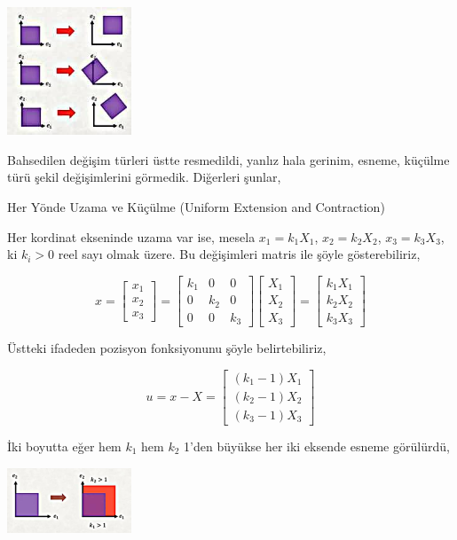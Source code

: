\documentclass[12pt,fleqn]{article}\usepackage{../../common}
\begin{document}
\includegraphics[width=10em]{phy_020_strs_01_04.jpg}

Bahsedilen değişim türleri üstte resmedildi, yanlız hala gerinim, esneme,
küçülme türü şekil değişimlerini görmedik. Diğerleri şunlar,

Her Yönde Uzama ve Küçülme (Uniform Extension and Contraction)

Her kordinat ekseninde uzama var ise, mesela $x_1 = k_1 X_1$, $x_2 = k_2 X_2$,
$x_3 = k_3 X_3$, ki $k_i > 0$ reel sayı olmak üzere. Bu değişimleri matris
ile şöyle gösterebiliriz,

$$
x = \left[\begin{array}{c}
x_1 \\ x_2 \\ x_3
\end{array}\right] =
\left[\begin{array}{ccc}
k_1 & 0   &   0 \\
0   & k_2 & 0 \\
0   & 0   & k_3
\end{array}\right]
\left[\begin{array}{c}
X_1 \\ X_2 \\ X_3 
\end{array}\right] =
\left[\begin{array}{c}
k_1 X_1 \\ k_2 X_2 \\ k_3 X_3 
\end{array}\right]
$$

Üstteki ifadeden pozisyon fonksiyonunu şöyle belirtebiliriz,

$$
u = x - X = \left[\begin{array}{ccc}
(k_1 - 1) X_1 \\ 
(k_2 - 1) X_2 \\ 
(k_3 - 1) X_3 
\end{array}\right]
$$

İki boyutta eğer hem $k_1$ hem $k_2$ 1'den büyükse her iki eksende esneme
görülürdü,

\includegraphics[width=10em]{phy_020_strs_01_06.jpg}
\end{document}

